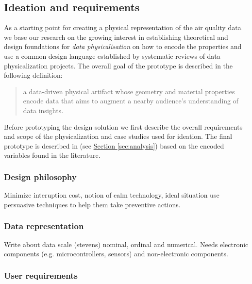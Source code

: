 \subsection{Ideation and requirements}

As a starting point for creating a physical representation of the air quality data we base our research on the growing interest in establishing theoretical and design foundations for \textit{data physicalisation} \cite{hornecker_design_2023, sauve_physecology_2022, bae_making_2022} on how to encode the properties and use a common design language \cite{ranasinghe_encoding_2023, sosa_data_2018} established by systematic reviews of data physicalization projects. The overall goal of the prototype is described in the following definition:

\begin{quote}
a data-driven physical artifact whose geometry and material properties encode data that aims to augment a nearby audience’s understanding of data insights.
\end{quote}

Before prototyping the design solution we first describe the overall requirements and scope of the physicalization and case studies used for ideation. The final prototype is described in (see \hyperref[sec:analysis]{Section \ref*{sec:analysis}}) based on the encoded variables found in the literature. 

\subsubsection{Design philosophy}

Minimize interuption cost, notion of calm technology, ideal situation use persuasive techniques to help them take preventive actions.

\subsubsection{Data representation}

Write about data scale (stevens) nominal, ordinal and numerical. Needs electronic components (e.g. microcontrollers, sensors) and non-electronic components.

\subsubsection{User requirements}

